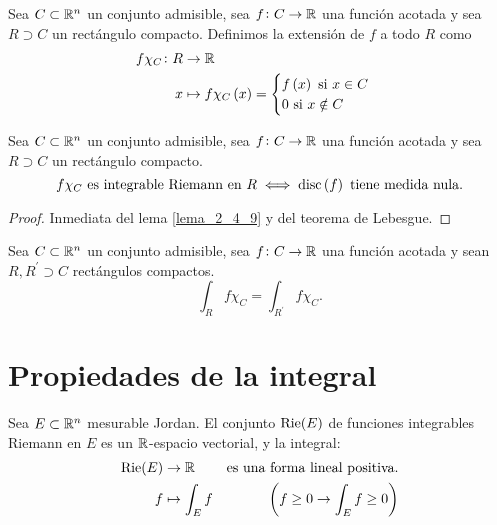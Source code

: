 \begin{defi}
    Sea $C \subset \mathbb{R}^n$ un conjunto admisible, sea $f \colon C \to \mathbb{R}$ una función acotada y sea $R \supset C$ un rectángulo compacto. Definimos la extensión de $f$ a todo $R$ como
    \begin{align*}
        f \chi_C \colon R &\to \mathbb{R} \\
        x &\mapsto f \chi_C \left( x \right) = \begin{cases} f \left( x \right) \text{ si } x \in C \\ 0 \text{ si } x \notin C \end{cases}
    \end{align*}
\end{defi}

\begin{lema}
    Sea $C \subset \mathbb{R}^n$ un conjunto admisible, sea $f \colon C \to \mathbb{R}$ una función acotada y sea $R \supset C$ un rectángulo compacto.
    \[
        f \chi_C \text{ es integrable Riemann en } R \iff \operatorname{disc} \left( f \right) \text{ tiene medida nula}.
    \]
\end{lema}

\begin{proof}
    Inmediata del lema \ref{lema_2_4_9} y del teorema de Lebesgue.
\end{proof}

\begin{lema}
    Sea $C \subset \mathbb{R}^n$ un conjunto admisible, sea $f \colon C \to \mathbb{R}$ una función acotada y sean $R, R^{\prime} \supset C$ rectángulos compactos.
    \[
        \int_R f \chi_C = \int_{R^{\prime}} f \chi_C.
    \]
\end{lema}

\section{Propiedades de la integral}

\begin{prop}
    Sea $E \subset \mathbb{R}^n$ mesurable Jordan. El conjunto $\operatorname{Rie}(E)$ de funciones integrables Riemann en $E$ es un $\mathbb{R}$-espacio vectorial, y la integral:
    \begin{align*}
        \operatorname{Rie}(E) &\to \mathbb{R} & \text{es una forma lineal positiva.} \\
        f &\mapsto \int_E f & \left( f \geq 0 \to \int_E f \geq 0 \right)
    \end{align*}
\end{prop}

